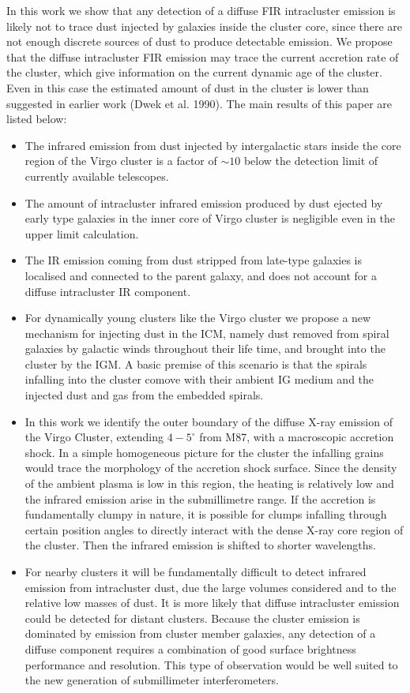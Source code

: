 \documentclass[]{aa}
\begin{document}
In this work we show that any detection of a diffuse FIR intracluster emission
is likely not to trace dust injected by galaxies inside the cluster
core, since there are not enough discrete sources of dust to produce
detectable emission. We propose that the diffuse intracluster FIR emission may
trace the current accretion rate of the cluster, which give information on the
current dynamic age of the cluster. Even in this case the estimated amount of 
dust in the cluster is lower than suggested in earlier work (Dwek et al. 1990). 
The main results of this paper are listed 
below:
\begin{itemize}
\item 
The infrared emission from dust injected by intergalactic stars inside the core
region of the Virgo cluster is a factor of $\sim 10$ below the detection limit
of currently available telescopes.
\item The amount of intracluster infrared emission produced by dust ejected by
early type galaxies in the inner core of Virgo cluster is negligible even in
the upper limit calculation.
\item The IR emission coming from dust stripped from late-type galaxies is
localised and connected to the parent galaxy, and does not account for a
diffuse intracluster IR component.
\item
For dynamically young clusters like the Virgo cluster we propose a new
mechanism for injecting dust in the ICM, namely dust removed from spiral
galaxies by galactic winds throughout their life time, and brought into the
cluster by the IGM. A basic premise of this scenario is that the
spirals infalling into the cluster comove with their ambient IG medium and the
injected dust and gas from the embedded spirals.
\item In this work we identify the outer boundary of the diffuse X-ray 
emission of the Virgo Cluster, extending $4-5^{\circ}$ from M87, with a
macroscopic accretion shock. In a simple homogeneous picture for the cluster
the infalling grains would trace the morphology of the accretion shock
surface. Since the density of the ambient plasma is low in this region, the
heating is relatively low and the infrared emission arise in the submillimetre
range. If the accretion is fundamentally clumpy in nature, it is possible for
clumps infalling through certain position angles to directly interact with the
dense X-ray core region of the cluster. Then the infrared emission is shifted
to shorter wavelengths.
\item
For nearby clusters it will be fundamentally difficult to detect infrared
emission from intracluster dust, due the large volumes considered and to the
relative low masses of dust. It is more likely that diffuse intracluster 
emission could be detected for distant clusters. Because the cluster emission 
is dominated by emission from cluster member galaxies, any detection of a 
diffuse component requires a combination of good surface brightness 
performance and resolution. This type of observation would be well suited to 
the new generation of submillimeter interferometers. 
\end{itemize}
\end{document}

